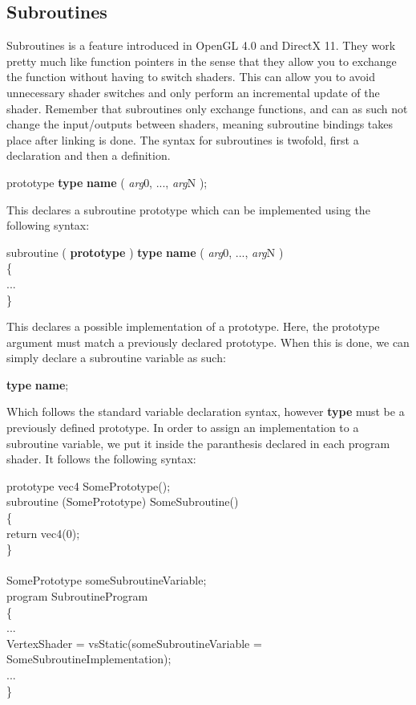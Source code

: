 \documentclass{article}
\newcommand{\SyntaxBox}[1]
{	
	\begin{center}
	\colorbox{orange!60}
	{
		\begin{minipage}{\linewidth}
		\hfill
		\begin{tabbing}
		#1
		\end{tabbing}
		\end{minipage}
	}
	\end{center}
}
\begin{document}
\subsection{Subroutines}
\label{sec:subroutines}
Subroutines is a feature introduced in OpenGL 4.0 and DirectX 11. They work pretty much like function pointers in the sense that they allow you  to exchange the function without having to switch shaders. This can allow you to avoid unnecessary shader switches and only perform an incremental update of the shader. Remember that subroutines only exchange functions, and can as such not change the input/outputs between shaders, meaning subroutine bindings takes place after linking is done. The syntax for subroutines is twofold, first a declaration and then a definition.

\SyntaxBox
{
	prototype  \textbf{type} \textbf{name} ( \textit{arg}0, ..., \textit{arg}N );
}

This declares a subroutine prototype which can be implemented using the following syntax:

\SyntaxBox
{
	subroutine ( \textbf{prototype} ) \textbf{type} \textbf{name} ( \textit{arg}0, ..., \textit{arg}N ) \\
	\{ \\
		... \\
	\}
}

This declares a possible implementation of a prototype. Here, the prototype argument must match a previously declared prototype. When this is done, we can simply declare a subroutine variable as such:

\SyntaxBox
{
	\textbf{type} \textbf{name};
}

Which follows the standard variable declaration syntax, however \textbf{type} must be a previously defined prototype. In order to assign an implementation to a subroutine variable, we put it inside the paranthesis declared in each program shader. It follows the following syntax:

\SyntaxBox
{
	prototype vec4 SomePrototype(); \\
	subroutine (SomePrototype) SomeSubroutine() \\
	\{ \= \\
	\>	return vec4(0); \\
	\} \\
	\\
	SomePrototype someSubroutineVariable; \\
	program SubroutineProgram \\
	\{ \= \\
	\>	... \\
	\>	VertexShader = vsStatic(someSubroutineVariable = SomeSubroutineImplementation); \\
	\>	... \\
	\}
}
\end{document}
